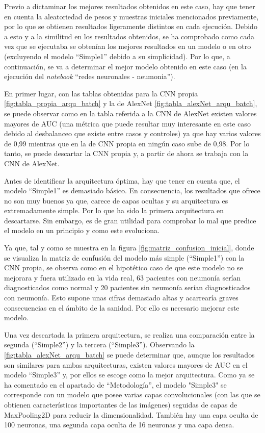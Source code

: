 Previo a dictaminar los mejores resultados obtenidos en este caso, hay que tener en cuenta la aleatoriedad de pesos y muestras iniciales mencionados previamente, por lo que se obtienen resultados ligeramente distintos en cada ejecución. Debido a esto y a la similitud en los resultados obtenidos, se ha comprobado como cada vez que se ejecutaba se obtenían los mejores resultados en un modelo o en otro (excluyendo el modelo ``Simple1'' debido a su simplicidad). Por lo que, a continuación, se va a determinar el mejor modelo obtenido en este caso (en la ejecución del \textit{notebook} ``redes neuronales - neumonia'').

En primer lugar, con las tablas obtenidas para la CNN propia \ref{fig:tabla_propia_arqu_batch} y la de AlexNet \ref{fig:tabla_alexNet_arqu_batch}, se puede observar como en la tabla referida a la CNN de AlexNet existen valores mayores de AUC (una métrica que puede resultar muy interesante en este caso debido al desbalanceo que existe entre casos y controles) ya que hay varios valores de 0,99 mientras que en la de CNN propia en ningún caso sube de 0,98. Por lo tanto, se puede descartar la CNN propia y, a partir de ahora se trabaja con la CNN de AlexNet.

Antes de identificar la arquitectura óptima, hay que tener en cuenta que, el modelo ``Simple1'' es demasiado básico. En consecuencia, los resultados que ofrece no son muy buenos ya que, carece de capas ocultas y su arquitectura es extremadamente simple. Por lo que ha sido la primera arquitectura en descartarse. Sin embargo, es de gran utilidad para comprobar lo mal que predice el modelo en un principio y como este evoluciona. 

Ya que, tal y como se muestra en la figura \ref{fig:matriz_confusion_inicial}, donde se visualiza la matriz de confusión del modelo más simple (``Simple1'') con la CNN propia, se observa como en el hipotético caso de que este modelo no se mejorara y fuera utilizado en la vida real, 63 pacientes con neumonía serían diagnosticados como normal y 20 pacientes sin neumonía serían diagnosticados con neumonía. Esto supone unas cifras demasiado altas y acarrearía graves consecuencias en el ámbito de la sanidad. Por ello es necesario mejorar este modelo.

Una vez descartada la primera arquitectura, se realiza una comparación entre la segunda (``Simple2'') y la tercera (``Simple3''). Observando la \ref{fig:tabla_alexNet_arqu_batch} se puede determinar que, aunque los resultados son similares para ambas arquitecturas, existen valores mayores de AUC en el modelo ``Simple3'' y, por ellos se escoge como la mejor arquitectura. Como ya se ha comentado en el apartado de ``Metodología'', el modelo "Simple3" se corresponde con un modelo que posee varias capas convolucionales (con las que se obtienen características importantes de las imágenes) seguidas de capas de MaxPooling2D para reducir la dimensionalidad. También hay una capa oculta de 100 neuronas, una segunda capa oculta de 16 neuronas y una capa densa.

